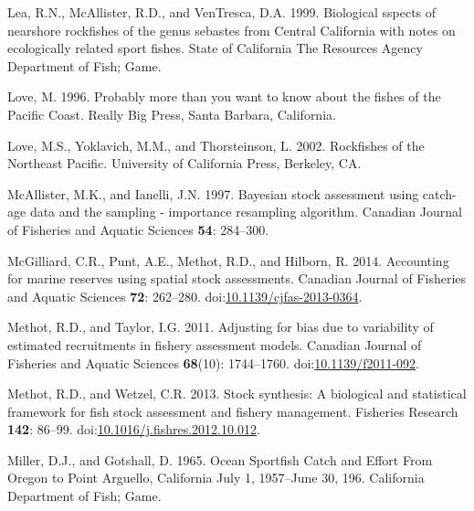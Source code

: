 \documentclass[11pt,
  english,
  letterpaper,
]{article}
\newlength{\cslhangindent}
\newenvironment{CSLReferences}[2] %
 {%
  \setlength{\parindent}{0pt}
  \ifodd #1 \everypar{\setlength{\hangindent}{\cslhangindent}}\ignorespaces\fi
  \ifnum #2 > 0
  \setlength{\parskip}{#2\baselineskip}
  \fi
 }%
 {}
\begin{document}
\begin{CSLReferences}{1}{0}
\leavevmode{}%
Lea, R.N., McAllister, R.D., and VenTresca, D.A. 1999. Biological sspects of nearshore rockfishes of the genus sebastes from {Central} {California} with notes on ecologically related sport fishes. State of California The Resources Agency Department of Fish; Game.

\leavevmode{}%
Love, M. 1996. Probably more than you want to know about the fishes of the {Pacific} {Coast}. Really Big Press, Santa Barbara, California.

\leavevmode{}%
Love, M.S., Yoklavich, M.M., and Thorsteinson, L. 2002. Rockfishes of the {Northeast} {Pacific}. University of California Press, Berkeley, CA.

\leavevmode{}%
McAllister, M.K., and Ianelli, J.N. 1997. Bayesian stock assessment using catch-age data and the sampling - importance resampling algorithm. Canadian Journal of Fisheries and Aquatic Sciences \textbf{54}: 284--300.

\leavevmode{}%
McGilliard, C.R., Punt, A.E., Methot, R.D., and Hilborn, R. 2014. Accounting for marine reserves using spatial stock assessments. Canadian Journal of Fisheries and Aquatic Sciences \textbf{72}: 262--280. doi:\href{https://doi.org/10.1139/cjfas-2013-0364}{10.1139/cjfas-2013-0364}.

\leavevmode{}%
Methot, R.D., and Taylor, I.G. 2011. Adjusting for bias due to variability of estimated recruitments in fishery assessment models. Canadian Journal of Fisheries and Aquatic Sciences \textbf{68}(10): 1744--1760. doi:\href{https://doi.org/10.1139/f2011-092}{10.1139/f2011-092}.

\leavevmode{}%
Methot, R.D., and Wetzel, C.R. 2013. Stock synthesis: A biological and statistical framework for fish stock assessment and fishery management. Fisheries Research \textbf{142}: 86--99. doi:\href{https://doi.org/10.1016/j.fishres.2012.10.012}{10.1016/j.fishres.2012.10.012}.

\leavevmode{}%
Miller, D.J., and Gotshall, D. 1965. Ocean {Sportfish} {Catch} and {Effort} {From} {Oregon} to {Point} {Arguello}, {California} {July} 1, 1957--{June} 30, 196. California Department of Fish; Game.


\end{CSLReferences}
\end{document}
